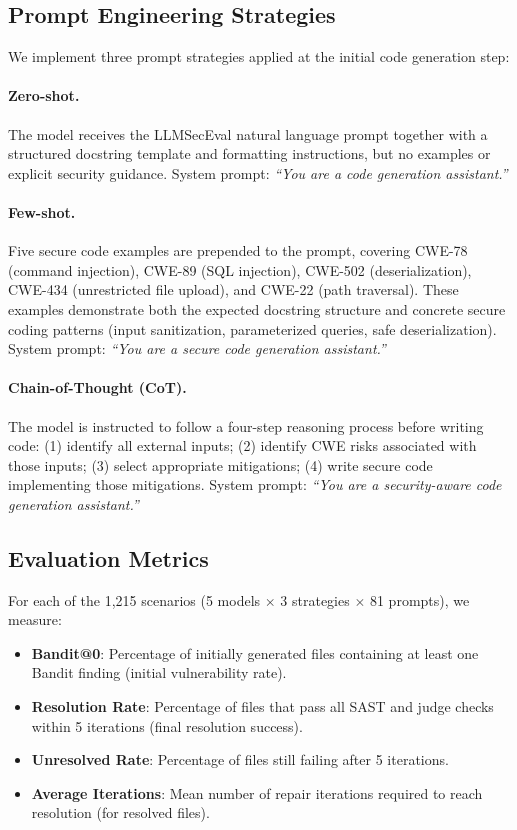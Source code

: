 \documentclass[runningheads]{llncs}
\begin{document}
\subsection{Prompt Engineering Strategies}

We implement three prompt strategies applied at the initial code generation step:

\paragraph{Zero-shot.} The model receives the LLMSecEval natural language prompt together with a structured docstring template and formatting instructions, but no examples or explicit security guidance. System prompt: \textit{``You are a code generation assistant.''}

\paragraph{Few-shot.} Five secure code examples are prepended to the prompt, covering CWE-78 (command injection), CWE-89 (SQL injection), CWE-502 (deserialization), CWE-434 (unrestricted file upload), and CWE-22 (path traversal). These examples demonstrate both the expected docstring structure and concrete secure coding patterns (input sanitization, parameterized queries, safe deserialization). System prompt: \textit{``You are a secure code generation assistant.''}

\paragraph{Chain-of-Thought (CoT).} The model is instructed to follow a four-step reasoning process before writing code: (1) identify all external inputs; (2) identify CWE risks associated with those inputs; (3) select appropriate mitigations; (4) write secure code implementing those mitigations. System prompt: \textit{``You are a security-aware code generation assistant.''}

\subsection{Evaluation Metrics}

For each of the 1,215 scenarios (5 models $\times$ 3 strategies $\times$ 81 prompts), we measure:
\begin{itemize}
  \item \textbf{Bandit@0}: Percentage of initially generated files containing at least one Bandit finding (initial vulnerability rate).
  \item \textbf{Resolution Rate}: Percentage of files that pass all SAST and judge checks within 5 iterations (final resolution success).
  \item \textbf{Unresolved Rate}: Percentage of files still failing after 5 iterations.
  \item \textbf{Average Iterations}: Mean number of repair iterations required to reach resolution (for resolved files).
\end{itemize}
\end{document}
